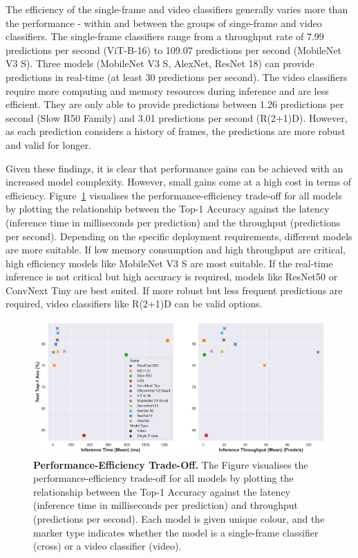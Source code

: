 \documentclass[a4paper]{article}
\begin{document}
The efficiency of the single-frame and video classifiers generally varies more
than the performance - within and between the groups of singe-frame and video
classifiers. The single-frame classifiers range from a throughput rate of 7.99
predictions per second (ViT-B-16) to 109.07 predictions per second (MobileNet V3
S). Three models (MobileNet V3 S, AlexNet, ResNet 18) can provide predictions in
real-time (at least 30 predictions per second). The video classifiers require
more computing and memory resources during inference and are less efficient.
They are only able to provide predictions between 1.26 predictions per second
(Slow R50 Family) and 3.01 predictions per second (R(2+1)D). However, as each
prediction considers a history of frames, the predictions are more robust and
valid for longer.

Given these findings, it is clear that performance gains can be achieved with an
increased model complexity. However, small gains come at a high cost in terms of
efficiency. Figure~\ref{fig:tradeoff} visualises the performance-efficiency
trade-off for all models by plotting the relationship between the Top-1 Accuracy
against the latency (inference time in milliseconds per prediction) and the
throughput (predictions per second). Depending on the specific deployment
requirements, different models are more suitable. If low memory consumption and
high throughput are critical, high efficiency models like MobileNet V3 S are
most suitable. If the real-time inference is not critical but high accuracy is
required, models like ResNet50 or ConvNext Tiny are best suited. If more robust
but less frequent predictions are required, video classifiers like R(2+1)D can
be valid options.

\begin{figure}
\centering
\includegraphics[width=\textwidth]{
./figures/performance-efficiency-tradeoff-scatter.png}
\caption{
  \textbf{Performance-Efficiency Trade-Off.} The Figure visualises the
  performance-efficiency trade-off for all models by plotting the
  relationship between the Top-1 Accuracy against the latency (inference
  time in milliseconds per prediction) and throughput (predictions per
  second). Each model is given unique colour, and the marker type indicates
  whether the model is a single-frame classifier (cross) or a video
  classifier (video).
}

\label{fig:tradeoff}
\end{figure}
\end{document}
